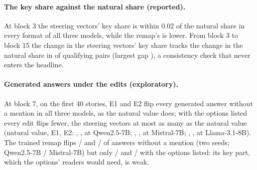 \paragraph{The key share against the natural share (reported).} At block 3 the steering vectors' key share is within 0.02 of the natural share in every format of all three models, while the remap's is lower. From block 3 to block 15 the change in the steering vectors' key share tracks the change in the natural share in \JcJcfourHold{} of \JcJcfourN{} qualifying pairs (largest gap \JcJcfourAbsMax{}), a consistency check that never enters the headline. %

\paragraph{Generated answers under the edits (exploratory).} At block 7, on the first 40 stories, E1 and E2 flip every generated answer without a mention in all three models, as the natural value does; with the options listed every edit flips fewer, the steering vectors at most as many as the natural value (natural value, E1, E2: \JcOfourOptNatQwenSeven{}, \JcOfourOptEoneQwenSeven{}, \JcOfourOptEtwoQwenSeven{} at Qwen2.5-7B; \JcOfourOptNatMistralSeven{}, \JcOfourOptEoneMistralSeven{}, \JcOfourOptEtwoMistralSeven{} at Mistral-7B; \JcOfourOptNatLlamaEight{}, \JcOfourOptEoneLlamaEight{}, \JcOfourOptEtwoLlamaEight{} at Llama-3.1-8B). The trained remap flips \JcOfourNoneEfouraQwenSeven{} / \JcOfourNoneEfouraMistralSeven{} and \JcOfourNoneEfourbQwenSeven{} / \JcOfourNoneEfourbMistralSeven{} of answers without a mention (two seeds; Qwen2.5-7B / Mistral-7B) but only \JcOfourOptEfouraQwenSeven{} / \JcOfourOptEfouraMistralSeven{} and \JcOfourOptEfourbQwenSeven{} / \JcOfourOptEfourbMistralSeven{} with the options listed: its key part, which the options' readers would need, is weak.
